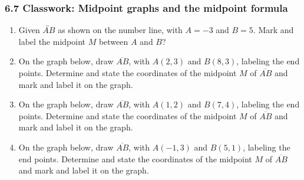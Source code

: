 \documentclass[12pt, twoside]{article}
\begin{document}
\subsubsection*{6.7 Classwork: Midpoint graphs and the midpoint formula}
  \begin{enumerate}

  \item Given $\overleftrightarrow{AB}$ as shown on the number line, with $A=-3$ and $B=5$. Mark and label the midpoint $M$ between $A$ and $B$?\\[20pt] %
  
  \item On the graph below, draw $\overline{AB}$, with $A(2,3)$ and $B(8,3)$, labeling the end points. Determine and state the coordinates of the midpoint $M$ of $\overline{AB}$ and mark and label it on the graph.
  \begin{flushright}
  \end{flushright}
  
  
  \item On the graph below, draw $\overline{AB}$, with $A(1,2)$ and $B(7,4)$, labeling the end points. Determine and state the coordinates of the midpoint $M$ of $\overline{AB}$ and mark and label it on the graph.
  \begin{flushright}
  \end{flushright}
  \vspace{1cm}

\newpage
  \item On the graph below, draw $\overline{AB}$, with $A(-1,3)$ and $B(5,1)$, labeling the end points. Determine and state the coordinates of the midpoint $M$ of $\overline{AB}$ and mark and label it on the graph.
  \begin{flushright}
  \end{flushright}


\end{enumerate}
\end{document}
